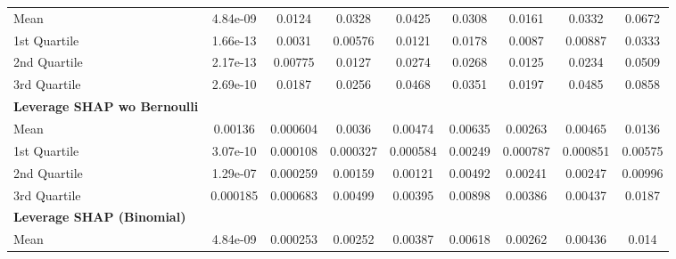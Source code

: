 {\begin{tabular} {lcccccccc}
\hspace{7pt}Mean & \cellcolor{silver!60}4.84e-09 & 0.0124 & 0.0328 & 0.0425 & 0.0308 & 0.0161 & 0.0332 & 0.0672 \\
\hspace{7pt}1st Quartile & 1.66e-13 & 0.0031 & 0.00576 & 0.0121 & 0.0178 & 0.0087 & 0.00887 & 0.0333 \\
\hspace{7pt}2nd Quartile & \cellcolor{bronze!60}2.17e-13 & 0.00775 & 0.0127 & 0.0274 & 0.0268 & 0.0125 & 0.0234 & 0.0509 \\
\hspace{7pt}3rd Quartile & \cellcolor{bronze!60}2.69e-10 & 0.0187 & 0.0256 & 0.0468 & 0.0351 & 0.0197 & 0.0485 & 0.0858 \\
\addlinespace[1ex]
\textbf{Leverage SHAP wo Bernoulli} &  &  &  &  &  &  &  &  \\
\hspace{7pt}Mean & 0.00136 & \cellcolor{bronze!60}0.000604 & \cellcolor{bronze!60}0.0036 & \cellcolor{bronze!60}0.00474 & \cellcolor{silver!60}0.00635 & \cellcolor{bronze!60}0.00263 & \cellcolor{silver!60}0.00465 & \cellcolor{gold!60}0.0136 \\
\hspace{7pt}1st Quartile & 3.07e-10 & 0.000108 & \cellcolor{bronze!60}0.000327 & \cellcolor{bronze!60}0.000584 & \cellcolor{bronze!60}0.00249 & \cellcolor{gold!60}0.000787 & 0.000851 & \cellcolor{silver!60}0.00575 \\
\hspace{7pt}2nd Quartile & 1.29e-07 & \cellcolor{bronze!60}0.000259 & \cellcolor{bronze!60}0.00159 & \cellcolor{bronze!60}0.00121 & \cellcolor{silver!60}0.00492 & \cellcolor{bronze!60}0.00241 & \cellcolor{bronze!60}0.00247 & \cellcolor{bronze!60}0.00996 \\
\hspace{7pt}3rd Quartile & 0.000185 & \cellcolor{bronze!60}0.000683 & \cellcolor{bronze!60}0.00499 & \cellcolor{bronze!60}0.00395 & \cellcolor{bronze!60}0.00898 & \cellcolor{silver!60}0.00386 & \cellcolor{silver!60}0.00437 & \cellcolor{gold!60}0.0187 \\
\addlinespace[1ex]
\textbf{Leverage SHAP (Binomial)} &  &  &  &  &  &  &  &  \\
\hspace{7pt}Mean & 4.84e-09 & \cellcolor{silver!60}0.000253 & \cellcolor{silver!60}0.00252 & \cellcolor{gold!60}0.00387 & \cellcolor{gold!60}0.00618 & \cellcolor{silver!60}0.00262 & \cellcolor{gold!60}0.00436 & \cellcolor{bronze!60}0.014 \\

\end{tabular}}
